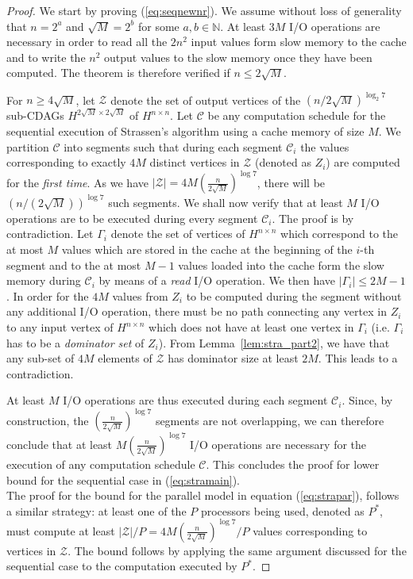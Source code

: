 \documentclass[a4paper,UKenglish]{lipics-v2016}
\newcommand{\io }{I/O }
\begin{document}
\begin{proof}
We start by proving (\ref{eq:seqnewnr}). We assume without loss of generality that $n = 2^a$ and $\sqrt{M}=2^b$  for some $a,b\in \mathbb{N}$. At least $3M$ \io operations are necessary in order to read all the $2n^2$ input values form slow memory to the cache and to write the $n^2$ output values to the slow memory once they have been computed. The theorem is therefore verified if $n\leq 2\sqrt{M}$. 

For $n\geq 4\sqrt{M}$, let $\mathcal{Z}$ denote the set of output vertices of the $\left(n/2\sqrt{M}\right)^{\log_2 7}$ sub-CDAGs $H^{2\sqrt{M}\times 2\sqrt{M}}$ of $H^{n\times n}$.
	Let $\mathcal{C}$ be any computation schedule for the sequential execution of Strassen's algorithm using a cache memory of size $M$. 
	We partition $\mathcal{C}$ into segments such that during each segment $\mathcal{C}_i$ the values corresponding to exactly $4M$ distinct vertices in $\mathcal{Z}$ (denoted as $Z_i$) are computed for the \emph{first time}. As we have $|\mathcal{Z}|= 4M \left(\frac{n}{2\sqrt{M}}\right)^{\log 7}$, there will be $\left(n/\left(2\sqrt{M}\right)\right)^{\log 7}$ such segments.
We shall now verify that at least $M$ \io operations are to be executed during every segment $\mathcal{C}_i$. The proof is by contradiction.   
	 Let $\Gamma_i$ denote the set of vertices of $H^{n \times n}$ which correspond to the at most $M$ values which are stored in the cache at the beginning of the $i$-th segment and to the at most $M-1$ values loaded into the cache form the slow memory during $\mathcal{C}_i$ by means of a \emph{read} \io operation. We then have $|\Gamma_i|\leq 2M -1$.
	 In order for the $4M$ values from $Z_i$ to be computed during the segment without any additional \io operation, there must be no path connecting any vertex in $Z_i$ to any input vertex of $H^{n\times n}$ which does not have at least one vertex in $\Gamma_i$ (i.e. $\Gamma_i$ has to be a \emph{dominator set} of $Z_i$). From Lemma~\ref{lem:stra_part2}, we have that any sub-set of $4M$ elements of $\mathcal{Z}$ has dominator size at least $2M$. This leads to a contradiction.
	
	At least $M$ \io operations are thus executed during each segment $\mathcal{C}_i$. Since, by construction, the $\left(\frac{n}{2\sqrt{M}}\right)^{\log 7}$ segments are not overlapping, we can therefore conclude that at least $M\left(\frac{n}{2\sqrt{M}}\right)^{\log 7}$ \io operations are necessary for the execution of any computation schedule $\mathcal{C}$. This concludes the proof for lower bound for the sequential case in (\ref{eq:stramain}). \\
	The proof for the bound for the parallel model in equation (\ref{eq:strapar}), follows a similar strategy: at least one of the $P$ processors being used, denoted as $P^*$, must compute at least $|\mathcal{Z}|/P = 4M \left(\frac{n}{2\sqrt{M}}\right)^{\log 7}/P$ values corresponding to vertices in $\mathcal{Z}$. The bound follows by applying the same argument discussed for the sequential case to the computation executed by $P^*$. 
	\end{proof}
\end{document}
